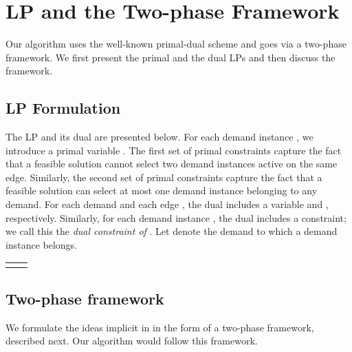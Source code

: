 \documentclass[11pt]{article}
\begin{document}
\section{LP and the Two-phase Framework}
Our algorithm uses the well-known primal-dual scheme and goes via a two-phase framework.
We first present the primal and the dual LPs and then discuss the framework.

\subsection{LP Formulation}
The LP and its dual are presented below.
For each demand instance , we introduce a primal variable .
The first set of primal constraints capture the fact that a feasible solution cannot
select two demand instances active on the same edge.
Similarly, the second set of primal constraints capture the fact that a feasible solution
can select at most one demand instance belonging to any demand.
For each demand  and each edge , the dual includes a variable  and ,
respectively. Similarly, for each demand instance , 
the dual includes a constraint; we call this the {\em dual constraint of }.
Let  denote the demand to which a demand instance  belongs.
\begin{tabular}{p{3in}p{3in}}

&

\end{tabular}



\subsection{Two-phase framework}
We formulate the ideas implicit in \cite{Pancj,Bar-Noy-Jacm,Lewin-Eytan} 
in the form of a two-phase framework, described next. Our algorithm would follow this framework.
\end{document}

